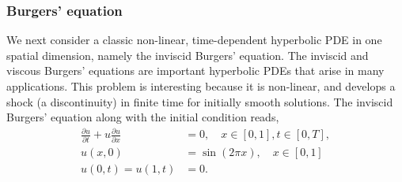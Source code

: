 \documentclass[12pt]{article}
\begin{document}
\subsubsection{Burgers' equation}
We next consider a classic non-linear, time-dependent hyperbolic PDE in one spatial dimension, namely the inviscid Burgers' equation. The inviscid and viscous Burgers' equations are important hyperbolic PDEs that arise in many applications.  This problem is interesting because it is non-linear, and develops a shock (a discontinuity) in finite time for initially smooth solutions. The inviscid Burgers' equation along with the initial condition reads,
\begin{displaymath}
\begin{split}
\frac{\partial u}{\partial t} + u \frac{\partial u}{\partial x} &= 0,  \quad x \in [0, 1], t \in [0, T],\\
u(x, 0) &= \sin(2 \pi x),  \quad x \in [0, 1]\\
u(0, t) = u(1, t) &= 0.
\end{split}
\end{displaymath}
\end{document}
